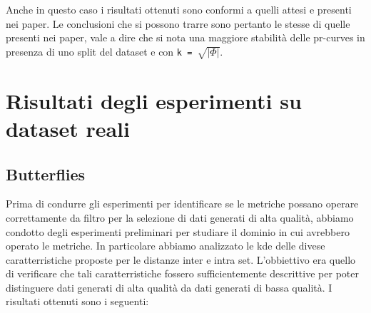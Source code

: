 Anche in questo caso i risultati ottenuti sono conformi a quelli attesi e presenti nei paper. Le conclusioni che si possono trarre sono pertanto le stesse di quelle presenti nei paper, vale a dire che si nota una maggiore stabilità delle pr-curves in presenza di uno split del dataset e con \texttt{k = \(\sqrt{|\Phi|}\)}.

\section{Risultati degli esperimenti su dataset reali}

\subsection{Butterflies}
\label{subsec:res-butterflies}

Prima di condurre gli esperimenti per identificare se le metriche possano operare correttamente da filtro per la selezione di dati generati di alta qualità, abbiamo condotto degli esperimenti preliminari per studiare il dominio in cui avrebbero operato le metriche.
In particolare abbiamo analizzato le kde delle divese caratterristiche proposte per le distanze inter e intra set. L'obbiettivo era quello di verificare che tali caratterristiche fossero sufficientemente descrittive per poter distinguere dati generati di alta qualità da dati generati di bassa qualità.
I risultati ottenuti sono i seguenti:

